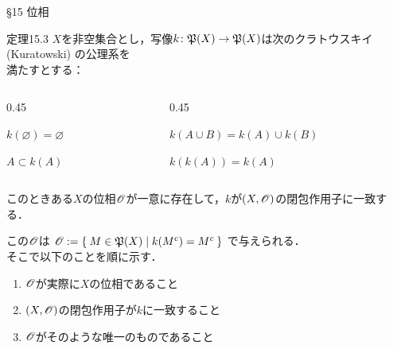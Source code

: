\documentclass[uplatex,a4paper,dvipdfmx,aspectratio=169,11pt]{beamer}
\begin{document}
\begin{frame}[fragile]{\S 15 位相}
    \begin{block}{定理15.3}
        $X$を非空集合とし，写像$k \colon \mathord{\mathfrak{P}}\qty(X) \to \mathord{\mathfrak{P}}\qty(X)$は次の\alert{クラトウスキイ} (Kuratowski) \alert{の公理系}を\\満たすとする：
        \begin{columns}
            \begin{column}{0.45\textwidth}
                \begin{description}[$\textbf{K}_1$:]
                    \item[$\textbf{K}_1$:] $k(\varnothing) = \varnothing$
                    \item[$\textbf{K}_2$:] $A \subset k(A)$
                \end{description}
            \end{column}
            \begin{column}{0.45\textwidth}
                \begin{description}[$\textbf{K}_1$:]
                    \item[$\textbf{K}_3$:] $k(A \cup B) = k(A) \cup k(B)$
                    \item[$\textbf{K}_4$:] $k(k(A)) = k(A)$
                \end{description}
            \end{column}
        \end{columns}
        \vspace{0.5em}
        このときある$X$の位相$\mathscr{O}$が一意に存在して，$k$が$(X, \mathscr{O})$の閉包作用子に一致する．
    \end{block}

    \medskip{}

     \quad この$\mathscr{O}$は
    \begin{math}
        \mathscr{O} := \Set{ M \in {\mathord{\mathfrak{P}}\qty(X)} | k(M^c) = M^c}
    \end{math}
    で与えられる．\\そこで以下のことを順に示す．
    \begin{enumerate}
        \item $\mathscr{O}$が実際に$X$の位相であること
        \item $(X, \mathscr{O})$の閉包作用子が$k$に一致すること
        \item $\mathscr{O}$がそのような唯一のものであること
    \end{enumerate}
\end{frame}
\end{document}
